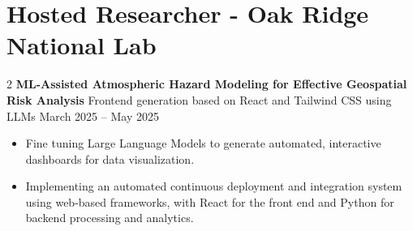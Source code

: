 \documentclass[10pt, letterpaper]{article}
\newenvironment{highlights}{
    \begin{itemize}[
        topsep=0.10 cm,
        parsep=0.10 cm,
        partopsep=0pt,
        itemsep=0pt,
        leftmargin=0 cm + 10pt
    ]
}{
    \end{itemize}
} %
\newenvironment{twocolentry}[2][]{
    \onecolentry
    \def\secondColumn{#2}
    \setcolumnwidth{\fill, 4.5 cm}
    \begin{paracol}{2}
}{
    \switchcolumn \raggedleft \secondColumn
    \end{paracol}
    \endonecolentry
} %
\begin{document}
\vspace{0.3cm}




    \section*{Hosted Researcher - Oak Ridge National Lab}
    \small

    \vspace{0.3cm} \begin{twocolentry}{March 2025 – May 2025} \textbf{ML-Assisted Atmospheric Hazard Modeling for Effective Geospatial Risk Analysis} \textbar Frontend generation based on React and Tailwind CSS using LLMs \end{twocolentry}
    
    \begin{highlights}  
        \item Fine tuning Large Language Models to generate automated, interactive dashboards for data visualization.  
        \item Implementing an automated continuous deployment and integration system using web-based frameworks, with React for the front end and Python for backend processing and analytics.  
    \end{highlights}  
    
        \vspace{0.3cm} 
\end{document}
